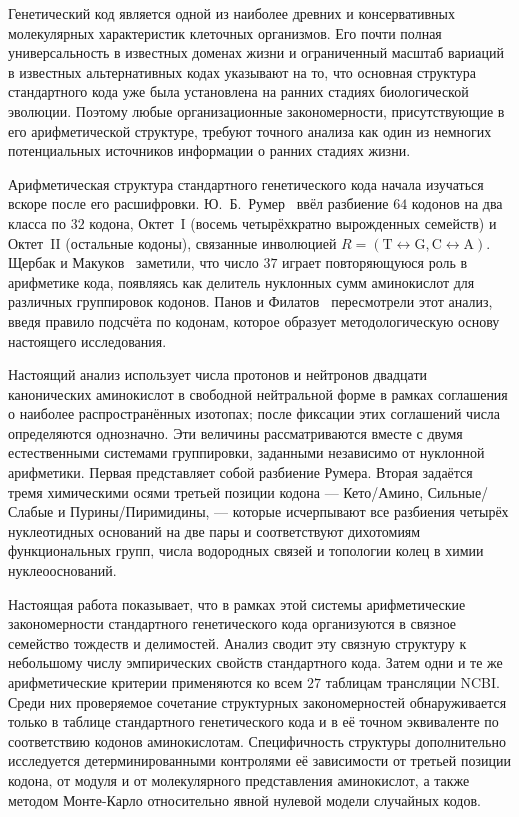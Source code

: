 \documentclass[11pt,a4paper]{article}
\renewcommand{\_}{\origunderscore\allowbreak}
\begin{document}
Генетический код является одной из наиболее
древних и консервативных молекулярных
характеристик клеточных организмов. Его почти
полная универсальность в известных доменах
жизни и ограниченный масштаб вариаций в
известных альтернативных кодах указывают на
то, что основная структура стандартного кода
уже была установлена на ранних стадиях
биологической эволюции. Поэтому любые организационные закономерности, присутствующие в его арифметической структуре, требуют точного анализа как один из немногих потенциальных источников информации о ранних стадиях жизни.

Арифметическая структура стандартного генетического кода начала изучаться вскоре после его расшифровки. Ю.~Б.~Румер~\cite{rumer1966,rumer1968}
ввёл разбиение $64$ кодонов на два класса по
$32$ кодона, Октет~I
(восемь четырёхкратно вырожденных семейств) и
Октет~II
(остальные кодоны), связанные инволюцией
$R = (\mathrm{T} \leftrightarrow
\mathrm{G}, \mathrm{C} \leftrightarrow
\mathrm{A})$. Щербак и
Макуков~\cite{makukov2013} заметили, что
число $37$ играет повторяющуюся роль в
арифметике кода, появляясь как делитель
нуклонных сумм аминокислот для различных
группировок кодонов. Панов и
Филатов~\cite{panov2024} пересмотрели этот
анализ, введя правило подсчёта по кодонам,
которое образует методологическую основу
настоящего исследования.

Настоящий анализ использует числа протонов и нейтронов двадцати канонических аминокислот в свободной нейтральной форме в рамках соглашения о наиболее распространённых изотопах; после фиксации этих соглашений числа определяются однозначно. Эти величины рассматриваются вместе с двумя естественными системами группировки, заданными независимо от нуклонной арифметики.
Первая представляет собой разбиение Румера.
Вторая задаётся тремя химическими осями
третьей позиции кодона ---
Кето/Амино, Сильные/Слабые и
Пурины/Пиримидины, --- которые исчерпывают
все разбиения четырёх нуклеотидных оснований
на две пары и соответствуют дихотомиям
функциональных групп, числа водородных
связей и топологии колец в химии
нуклеооснований.

Настоящая работа показывает, что в рамках
этой системы арифметические закономерности
стандартного генетического кода организуются
в связное семейство тождеств и
делимостей. Анализ сводит эту связную
структуру к небольшому числу эмпирических
свойств стандартного кода. Затем одни и те же арифметические критерии применяются ко всем $27$
таблицам трансляции NCBI. Среди них проверяемое сочетание структурных
закономерностей обнаруживается только в таблице стандартного
генетического кода и в её точном эквиваленте по соответствию кодонов
аминокислотам. Специфичность
структуры дополнительно исследуется
детерминированными контролями её зависимости от третьей позиции кодона, от модуля и от молекулярного представления аминокислот, а также методом
Монте-Карло относительно явной нулевой модели
случайных кодов.
\end{document}
